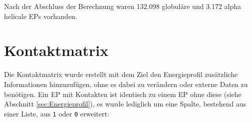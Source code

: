 Nach der Abschluss der Berechnung waren 132.098 globuläre und 3.172 alpha helicale \ac{EP}s vorhanden.

\section{Kontaktmatrix}
\label{sec:Kontaktmatrix}
Die Kontaktmatrix wurde erstellt mit dem Ziel den Energieprofil zusätzliche Informationen hinzuzufügen, ohne es dabei zu verändern oder externe Daten zu benötigen. Ein \ac{EP} mit Kontakten ist identisch zu einem \ac{EP} ohne diese (siehe Abschnitt \ref{sec:Energieprofil}), es wurde lediglich um eine Spalte, bestehend aus einer Liste, aus \texttt{1} oder \texttt{0} erweitert:


\begin{table}
    \centering
    \caption{Dargestellt ist das gleiche \ac{EP} wie in \ac{Abb} \ref{tab:EP}, mit zusätzlichem Kontaktprofil in jeder \texttt{ENGY} Zeile, hierbei steht eine 1 für einen Kontakt und eine 0 für keinen Kontakt innerhalb der 8 Angström Sprähre, vergleiche \ref{fig:8A_Sphaere}.}
    \label{tab:kontaktmatrix}
\end{table}
